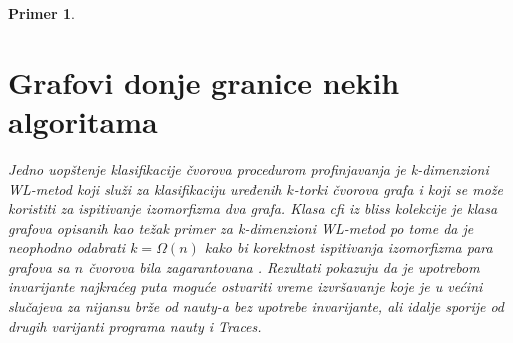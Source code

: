 \documentclass[12pt,oneside]{memoir}
\newtheorem{example}{Primer}
\theoremstyle{definition}
\begin{document}
\begin{example}
\begin{figure}[!h]
	\end{figure}

	\clearpage
    
  \section{Grafovi donje granice nekih algoritama}

	Jedno uopštenje klasifikacije čvorova procedurom profinjavanja je
	\emph{k-dimenzioni WL-metod} koji služi za klasifikaciju uređenih $k$-torki
	čvorova grafa i koji se može koristiti za ispitivanje izomorfizma dva
	grafa. Klasa \emph{cfi} iz \emph{bliss} kolekcije je klasa grafova opisanih
	kao težak primer za \emph{k}-dimenzioni WL-metod po tome da je neophodno
	odabrati $k = \Omega(n)$ kako bi korektnost ispitivanja izomorfizma para
	grafova sa $n$ čvorova bila zagarantovana \cite{CFI}.  Rezultati pokazuju
	da je upotrebom invarijante najkraćeg puta moguće ostvariti vreme
	izvršavanje koje je u većini slučajeva za nijansu brže od \emph{nauty}-a
	bez upotrebe invarijante, ali idalje sporije od drugih varijanti programa
	\emph{nauty} i \emph{Traces}.

	\begin{figure}[!h]
	\center
\end{figure}
\end{example}
\end{document}
